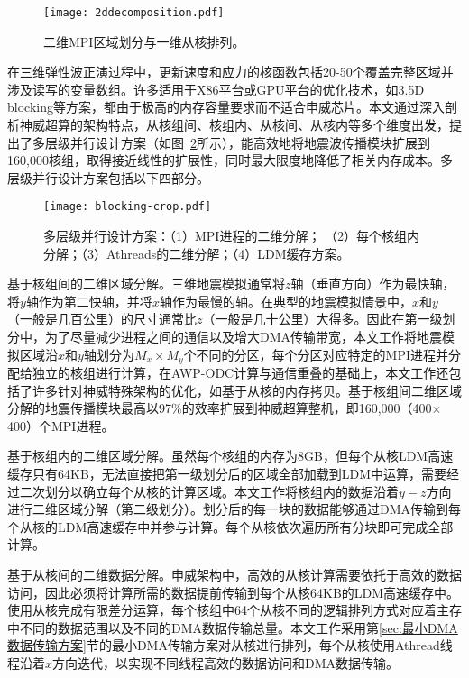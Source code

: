 \begin{figure}[th]
  \centering
  \texttt{[image: 2ddecomposition.pdf]}
  \caption{二维MPI区域划分与一维从核排列。}
  \label{fig:2ddecomposition}
\end{figure}

在三维弹性波正演过程中，更新速度和应力的核函数包括20-50个覆盖完整区域并涉及读写的变量数组。许多适用于X86平台或GPU平台的优化技术，如3.5D blocking等方案\citep {nguyen20103}，都由于极高的内存容量要求而不适合申威芯片。本文通过深入剖析神威超算的架构特点，从核组间、核组内、从核间、从核内等多个维度出发，提出了多层级并行设计方案（如图~\ref{fig:dd}所示），能高效地将地震波传播模块扩展到160,000核组，取得接近线性的扩展性，同时最大限度地降低了相关内存成本。多层级并行设计方案包括以下四部分。

\begin{figure}[ht]
\centering
\texttt{[image: blocking-crop.pdf]}
\caption{多层级并行设计方案：（1）MPI进程的二维分解； （2）每个核组内分解；（3）Athreads的二维分解；（4）LDM缓存方案。}
\label{fig:dd}
\end{figure}

基于核组间的二维区域分解。三维地震模拟通常将$ z $轴（垂直方向）作为最快轴，将$ y $轴作为第二快轴，并将$ x $轴作为最慢的轴。在典型的地震模拟情景中，$ x $和$ y $（一般是几百公里）的尺寸通常比$ z $（一般是几十公里）大得多。因此在第一级划分中，为了尽量减少进程之间的通信以及增大DMA传输带宽，本文工作将地震模拟区域沿$x$和$y$轴划分为$ M_x \times M_y $个不同的分区，每个分区对应特定的MPI进程并分配给独立的核组进行计算，在AWP-ODC\citep{cui2010scalable}计算与通信重叠的基础上，本文工作还包括了许多针对神威特殊架构的优化，如基于从核的内存拷贝。基于核组间二维区域分解的地震传播模块最高以97\%的效率扩展到神威超算整机，即160,000（400$\times$400）个MPI进程。

基于核组内的二维区域分解。虽然每个核组的内存为8GB，但每个从核LDM高速缓存只有64KB，无法直接把第一级划分后的区域全部加载到LDM中运算，需要经过二次划分以确立每个从核的计算区域。本文工作将核组内的数据沿着$ y-z $方向进行二维区域分解（第二级划分）。划分后的每一块的数据能够通过DMA传输到每个从核的LDM高速缓存中并参与计算。每个从核依次遍历所有分块即可完成全部计算。

基于从核间的二维数据分解。申威架构中，高效的从核计算需要依托于高效的数据访问，因此必须将计算所需的数据提前传输到每个从核64KB的LDM高速缓存中。使用从核完成有限差分运算，每个核组中64个从核不同的逻辑排列方式对应着主存中不同的数据范围以及不同的DMA数据传输总量。本文工作采用第\ref{sec:最小DMA数据传输方案}节的最小DMA传输方案对从核进行排列，每个从核使用Athread线程沿着$ x $方向迭代，以实现不同线程高效的数据访问和DMA数据传输。

